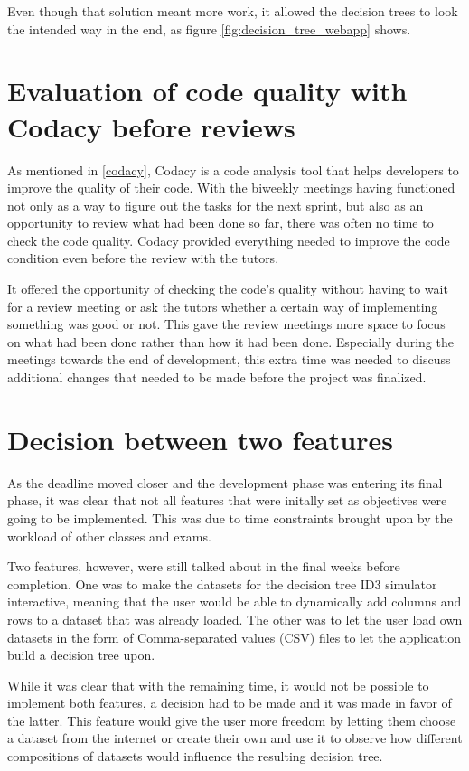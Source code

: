 Even though that solution meant more work, it allowed the decision trees to look the intended way in the end, as figure \ref{fig:decision_tree_webapp} shows.

\section{Evaluation of code quality with Codacy before reviews}
As mentioned in \ref{codacy}, Codacy is a code analysis tool that helps developers to improve the quality of their code. With the biweekly meetings having functioned not only as a way to figure out the tasks for the next sprint, but also as an opportunity to review what had been done so far, there was often no time to check the code quality. Codacy provided everything needed to improve the code condition even before the review with the tutors.

It offered the opportunity of checking the code's quality without having to wait for a review meeting or ask the tutors whether a certain way of implementing something was good or not.
This gave the review meetings more space to focus on what had been done rather than how it had been done. Especially during the meetings towards the end of development, this extra time was needed to discuss additional changes that needed to be made before the project was finalized.

\section{Decision between two features}
As the deadline moved closer and the development phase was entering its final phase, it was clear that not all features that were initally set as objectives were going to be implemented. This was due to time constraints brought upon by the workload of other classes and exams.

Two features, however, were still talked about in the final weeks before completion. One was to make the datasets for the decision tree ID3 simulator interactive, meaning that the user would be able to dynamically add columns and rows to a dataset that was already loaded. The other was to let the user load own datasets in the form of Comma-separated values (CSV) files to let the application build a decision tree upon.

While it was clear that with the remaining time, it would not be possible to implement both features, a decision had to be made and it was made in favor of the latter. This feature would give the user more freedom by letting them choose a dataset from the internet or create their own and use it to observe how different compositions of datasets would influence the resulting decision tree.

